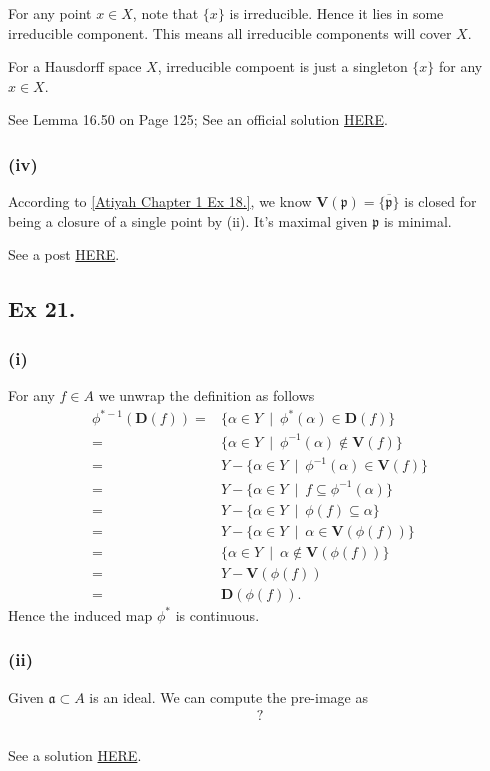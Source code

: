 For any point $x\in X$, note that $\{x\}$ is irreducible. Hence it lies in some irreducible component. This means all irreducible components will cover $X$.

For a Hausdorff space $X$, irreducible compoent is just a singleton $\{x\}$ for any $x\in X$.

See \cite{altman} Lemma 16.50 on Page 125; See an official solution \href{https://metaphor.ethz.ch/x/2019/hs/401-3660-69L/ex/SolSheet1.pdf}{HERE}.

\subsubsection{(iv)}

According to \ref{Atiyah Chapter 1 Ex 18.}, we know $\mathbf V(\mathfrak p)=\overline{\{\mathfrak p\}}$ is closed for being a closure of a single point by (ii). It's maximal given $\mathfrak p$ is minimal.

See a post \href{https://math.stackexchange.com/questions/764677/irreducible-components-of-speca}{HERE}.

\subsection{Ex 21.}\label{Atiyah Chapter 1 Ex 21.}

\subsubsection{(i)}

For any $f\in A$ we unwrap the definition as follows \begin{align*}
    \phi^{\ast -1}(\mathbf D(f)) =& \{\alpha\in Y ~\mid~ \phi^{\ast}(\alpha)\in \mathbf D(f)\}\\
    =& \{\alpha \in Y ~\mid~ \phi^{-1}(\alpha)\notin \mathbf V(f)\} \\
    =& Y-\{\alpha\in Y~\mid~ \phi^{-1}(\alpha)\in \mathbf V(f)\}\\
    =& Y-\{\alpha\in Y~\mid~ f\subseteq\phi^{-1}(\alpha)\}\\
    =& Y-\{\alpha\in Y~\mid~ \phi(f)\subseteq \alpha\}\\
    =& Y-\{\alpha\in Y~\mid~ \alpha\in \mathbf V(\phi(f))\}\\
    =& \{\alpha\in Y ~\mid~ \alpha\notin \mathbf V(\phi(f))\}\\
    =& Y-\mathbf V(\phi(f))\\
    =& \mathbf D(\phi(f)).
\end{align*}
Hence the induced map $\phi^{\ast}$ is continuous.

\subsubsection{(ii)}
Given $\mathfrak a\subset A$ is an ideal. We can compute the pre-image as \begin{align*}
    ?
\end{align*}

\subsubsection{}

See a solution \href{http://math_research.uct.ac.za/marques/US/AMforSophiesAGSeminar.pdf}{HERE}.